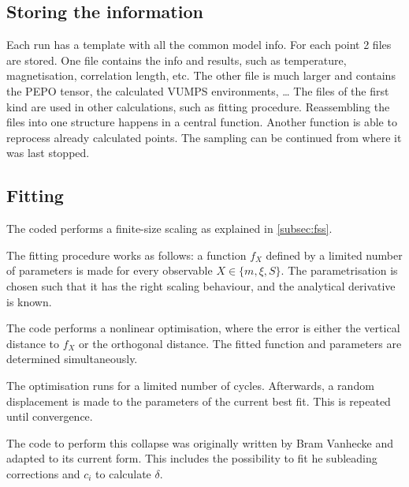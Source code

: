 \subsection{Storing the information}

Each run has a template with all the common model info. For each point 2 files are stored. One file contains the info and results, such as temperature, magnetisation, correlation length, etc. The other file is much larger and contains the PEPO tensor, the calculated VUMPS environments, \dots
The files of the first kind are used in other calculations, such as fitting procedure.  Reassembling the files into one structure happens in a central function. Another function is able to reprocess already calculated points. The sampling can be continued from where it was last stopped.

\subsection{Fitting}\label{subsec:qphasediag}

The coded performs a finite-size scaling as explained in \cref{subsec:fss}.

The fitting procedure works as follows: a function $f_X$ defined by a limited number of parameters is made for every observable $X \in \{ m , \xi, S \}$. The parametrisation is chosen such that it has the right scaling behaviour, and the analytical derivative is known.

The code performs a nonlinear optimisation, where the error is either the vertical distance to $f_X$ or the orthogonal distance. The fitted function and parameters are determined simultaneously.

The optimisation runs for a limited number of cycles. Afterwards, a random displacement is made to the parameters of the current best fit. This is repeated until convergence.

The code to perform this collapse was originally written by Bram Vanhecke and adapted to its current form. This includes the possibility to fit he subleading corrections and $c_i$ to calculate $\delta$.